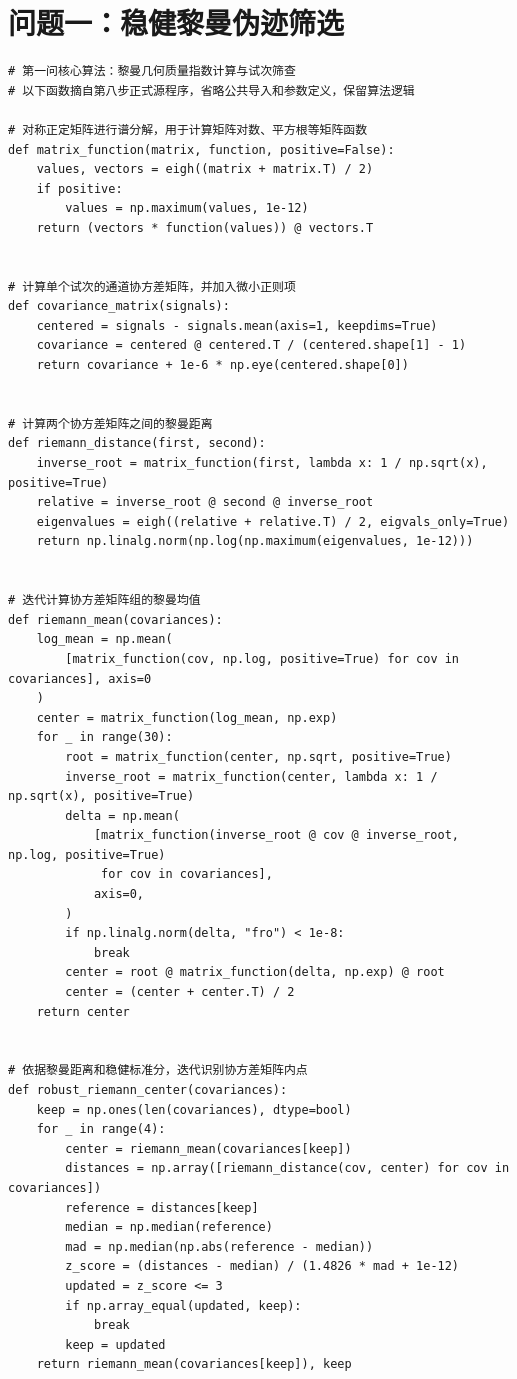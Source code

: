 \clearpage
\section{问题一：稳健黎曼伪迹筛选}
\begin{lstlisting}[style=appendixPython]
# 第一问核心算法：黎曼几何质量指数计算与试次筛查
# 以下函数摘自第八步正式源程序，省略公共导入和参数定义，保留算法逻辑

# 对称正定矩阵进行谱分解，用于计算矩阵对数、平方根等矩阵函数
def matrix_function(matrix, function, positive=False):
    values, vectors = eigh((matrix + matrix.T) / 2)
    if positive:
        values = np.maximum(values, 1e-12)
    return (vectors * function(values)) @ vectors.T


# 计算单个试次的通道协方差矩阵，并加入微小正则项
def covariance_matrix(signals):
    centered = signals - signals.mean(axis=1, keepdims=True)
    covariance = centered @ centered.T / (centered.shape[1] - 1)
    return covariance + 1e-6 * np.eye(centered.shape[0])


# 计算两个协方差矩阵之间的黎曼距离
def riemann_distance(first, second):
    inverse_root = matrix_function(first, lambda x: 1 / np.sqrt(x), positive=True)
    relative = inverse_root @ second @ inverse_root
    eigenvalues = eigh((relative + relative.T) / 2, eigvals_only=True)
    return np.linalg.norm(np.log(np.maximum(eigenvalues, 1e-12)))


# 迭代计算协方差矩阵组的黎曼均值
def riemann_mean(covariances):
    log_mean = np.mean(
        [matrix_function(cov, np.log, positive=True) for cov in covariances], axis=0
    )
    center = matrix_function(log_mean, np.exp)
    for _ in range(30):
        root = matrix_function(center, np.sqrt, positive=True)
        inverse_root = matrix_function(center, lambda x: 1 / np.sqrt(x), positive=True)
        delta = np.mean(
            [matrix_function(inverse_root @ cov @ inverse_root, np.log, positive=True)
             for cov in covariances],
            axis=0,
        )
        if np.linalg.norm(delta, "fro") < 1e-8:
            break
        center = root @ matrix_function(delta, np.exp) @ root
        center = (center + center.T) / 2
    return center


# 依据黎曼距离和稳健标准分，迭代识别协方差矩阵内点
def robust_riemann_center(covariances):
    keep = np.ones(len(covariances), dtype=bool)
    for _ in range(4):
        center = riemann_mean(covariances[keep])
        distances = np.array([riemann_distance(cov, center) for cov in covariances])
        reference = distances[keep]
        median = np.median(reference)
        mad = np.median(np.abs(reference - median))
        z_score = (distances - median) / (1.4826 * mad + 1e-12)
        updated = z_score <= 3
        if np.array_equal(updated, keep):
            break
        keep = updated
    return riemann_mean(covariances[keep]), keep



\end{lstlisting}
